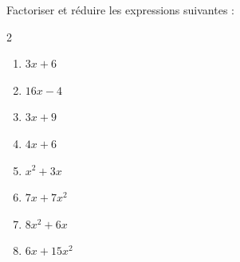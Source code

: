 \begin{exo}[Factorisation]
	Factoriser et réduire les expressions suivantes :
	\vspace*{-2mm}
	\begin{multicols}{2}
		\begin{enumerate}[label=\alph*)]
			\item $3x + 6$
			\item $16x - 4$
			\item $3x + 9$
			\item $4x + 6$
			\item $x^{2} + 3x$
			\item $7x + 7x^{2}$
			\item $8x^{2} + 6x$
			\item $6x + 15x^{2}$
		\end{enumerate}
	\end{multicols}
\end{exo}
